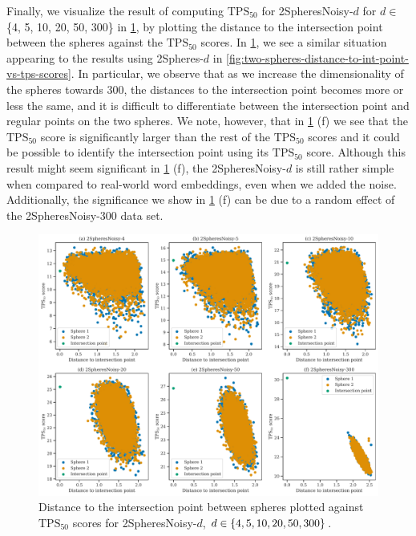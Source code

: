 Finally, we visualize the result of computing $\text{TPS}_{50}$ for 2SpheresNoisy-$d$ for $d \in$ \{{4, 5, 10, 20, 50, 300}\} in \cref{fig:two-spheres-noisy-distance-to-int-point-vs-tps-scores}, by plotting the distance to the intersection point between the spheres against the $\text{TPS}_{50}$ scores. In \cref{fig:two-spheres-noisy-distance-to-int-point-vs-tps-scores}, we see a similar situation appearing to the results using 2Spheres-$d$ in \cref{fig:two-spheres-distance-to-int-point-vs-tps-scores}. In particular, we observe that as we increase the dimensionality of the spheres towards 300, the distances to the intersection point becomes more or less the same, and it is difficult to differentiate between the intersection point and regular points on the two spheres. We note, however, that in \cref{fig:two-spheres-noisy-distance-to-int-point-vs-tps-scores} (f) we see that the $\text{TPS}_{50}$ score is significantly larger than the rest of the $\text{TPS}_{50}$ scores and it could be possible to identify the intersection point using its $\text{TPS}_{50}$ score. Although this result might seem significant in \cref{fig:two-spheres-noisy-distance-to-int-point-vs-tps-scores} (f), the 2SpheresNoisy-$d$ is still rather simple when compared to real-world word embeddings, even when we added the noise. Additionally, the significance we show in \cref{fig:two-spheres-noisy-distance-to-int-point-vs-tps-scores} (f) can be due to a random effect of the 2SpheresNoisy-300 data set.
\begin{figure}[H]
    \centering
    \includegraphics[width=\textwidth]{thesis/figures/two-spheres-noisy-distance-to-int-point-vs-tps-scores.pdf}
    \caption{Distance to the intersection point between spheres plotted against $\text{TPS}_{50}$ scores for 2SpheresNoisy-$d$, $d \in \left\{4, 5, 10, 20, 50, 300\right\}$.}
    \label{fig:two-spheres-noisy-distance-to-int-point-vs-tps-scores}
\end{figure}

